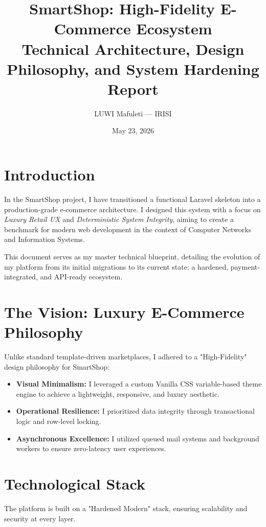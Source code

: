 \documentclass[12pt,a4paper]{article}
\title{
    \textbf{SmartShop: High-Fidelity E-Commerce Ecosystem} \\
    \large Technical Architecture, Design Philosophy, and System Hardening Report
}
\author{LUWI Mafuleti --- IRISI}
\date{May 23, 2026}
\begin{document}
\maketitle
\tableofcontents
\newpage

\section{Introduction}

In the SmartShop project, I have transitioned a functional Laravel skeleton into a production-grade e-commerce architecture. I designed this system with a focus on \textit{Luxury Retail UX} and \textit{Deterministic System Integrity}, aiming to create a benchmark for modern web development in the context of Computer Networks and Information Systems.

This document serves as my master technical blueprint, detailing the evolution of my platform from its initial migrations to its current state: a hardened, payment-integrated, and API-ready ecosystem.

\section{The Vision: Luxury E-Commerce Philosophy}

Unlike standard template-driven marketplaces, I adhered to a "High-Fidelity" design philosophy for SmartShop:
\begin{itemize}
    \item \textbf{Visual Minimalism:} I leveraged a custom Vanilla CSS variable-based theme engine to achieve a lightweight, responsive, and luxury aesthetic.
    \item \textbf{Operational Resilience:} I prioritized data integrity through transactional logic and row-level locking.
    \item \textbf{Asynchronous Excellence:} I utilized queued mail systems and background workers to ensure zero-latency user experiences.
\end{itemize}

\section{Technological Stack}

The platform is built on a "Hardened Modern" stack, ensuring scalability and security at every layer.
\end{document}

